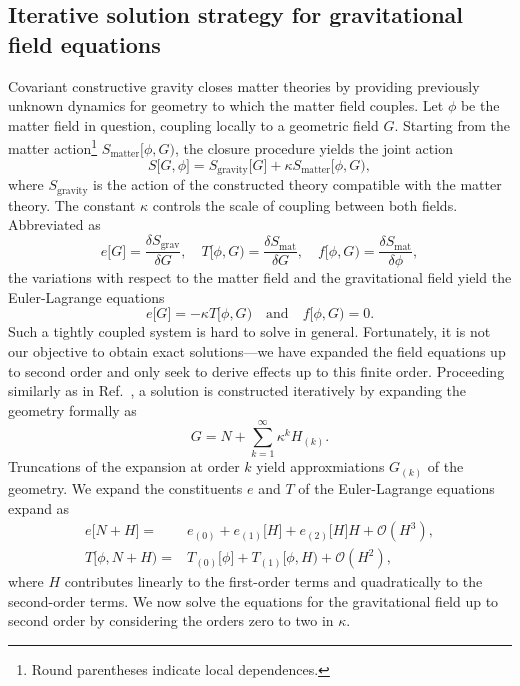 \subsection{Iterative solution strategy for gravitational field equations}\label{section_iterative_solution}
Covariant constructive gravity closes matter theories by providing previously unknown dynamics for geometry to which the matter field couples. Let $\phi$ be the matter field in question, coupling locally to a geometric field $G$. Starting from the matter action\footnote{Round parentheses indicate local dependences.} $S_\text{matter}\lbrack\phi, G)$, the closure procedure yields the joint action
\begin{equation}
  S\lbrack G,\phi\rbrack = S_\text{gravity}\lbrack G\rbrack + \kappa S_\text{matter}\lbrack\phi, G),
\end{equation}
where $S_\text{gravity}$ is the action of the constructed theory compatible with the matter theory. The constant $\kappa$ controls the scale of coupling between both fields. Abbreviated as
\begin{equation}
  e\lbrack G\rbrack = \frac{\delta S_\text{grav}}{\delta G},\quad T\lbrack\phi, G) = \frac{\delta S_\text{mat}}{\delta G},\quad f\lbrack\phi,G) = \frac{\delta S_\text{mat}}{\delta \phi},
\end{equation}
the variations with respect to the matter field and the gravitational field yield the Euler-Lagrange equations
\begin{equation}\label{coupled_euler_lagrange}
  e\lbrack G\rbrack = -\kappa T\lbrack\phi, G)\quad\text{and}\quad f\lbrack\phi,G) = 0.
\end{equation}
Such a tightly coupled system is hard to solve in general. Fortunately, it is not our objective to obtain exact solutions---we have expanded the field equations up to second order and only seek to derive effects up to this finite order. Proceeding similarly as in Ref.~\cite{poisson2014gravity}, a solution is constructed iteratively by expanding the geometry formally as
\begin{equation}
  G = N + \sum_{k=1}^\infty\kappa^k H_{(k)}.
\end{equation}
Truncations of the expansion at order $k$ yield approxmiations $G_{(k)}$ of the geometry. We expand the constituents $e$ and $T$ of the Euler-Lagrange equations expand as
\begin{equation}
  \begin{aligned}
    e\lbrack N + H\rbrack = {} & e_{(0)} + e_{(1)}\lbrack H\rbrack + e_{(2)}\lbrack H\rbrack H + \mathcal O(H^3), \\
    T\lbrack\phi, N + H) = {} & T_{(0)}\lbrack\phi\rbrack + T_{(1)}\lbrack\phi,H) + \mathcal O(H^2),
  \end{aligned}
\end{equation}
where $H$ contributes linearly to the first-order terms and quadratically to the second-order terms. We now solve the equations for the gravitational field up to second order by considering the orders zero to two in $\kappa$.

